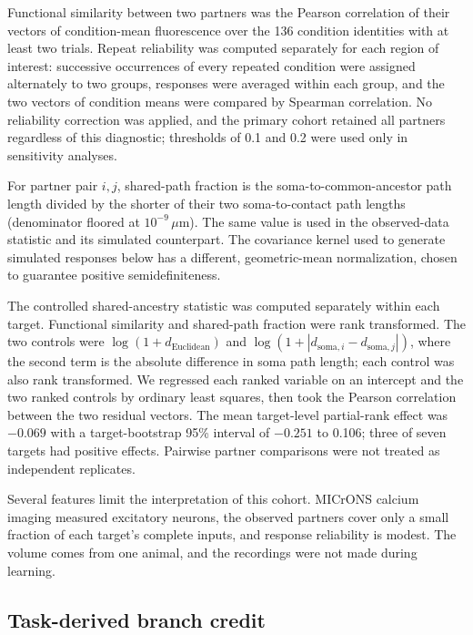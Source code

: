 Functional similarity between two partners was the Pearson correlation of
their vectors of condition-mean fluorescence over the 136 condition identities with
at least two trials. Repeat reliability was computed separately for each
region of interest: successive occurrences of every repeated condition were assigned alternately
to two groups, responses were averaged within each group,
and the two vectors of condition means were compared by Spearman correlation.
No reliability correction was applied, and the primary cohort retained all
partners regardless of this diagnostic; thresholds of 0.1 and 0.2 were used
only in sensitivity analyses.

For partner pair $i,j$, shared-path fraction is the soma-to-common-ancestor
path length divided by the shorter of their two soma-to-contact path lengths
(denominator floored at $10^{-9}\,\mu$m). The same value is used in the
observed-data statistic and its simulated counterpart. The covariance kernel
used to generate simulated responses below has a different, geometric-mean
normalization, chosen to guarantee positive semidefiniteness.

The controlled shared-ancestry statistic was computed separately within each
target. Functional similarity and shared-path fraction were rank transformed.
The two controls were $\log(1+d_{\mathrm{Euclidean}})$ and
$\log(1+|d_{\mathrm{soma},i}-d_{\mathrm{soma},j}|)$, where the second term is
the absolute difference in soma path length; each control was also rank
transformed. We regressed each ranked variable on an intercept and the two
ranked controls by ordinary least squares, then took the Pearson correlation
between the two residual vectors. The mean target-level partial-rank effect
was $-0.069$ with a target-bootstrap 95\% interval of $-0.251$ to 0.106;
three of seven targets had positive effects. Pairwise partner comparisons were
not treated as independent replicates.

Several features limit the interpretation of this cohort. MICrONS calcium
imaging measured excitatory neurons, the observed partners cover only a small
fraction of each target's complete inputs, and response reliability is modest.
The volume comes from one animal, and the recordings were not made during
learning.

\subsection{Task-derived branch credit}

